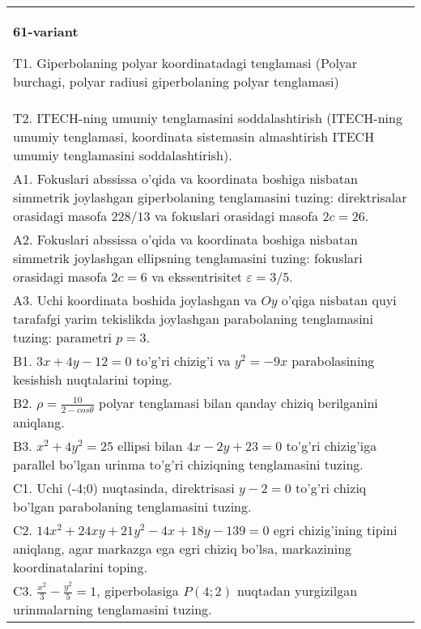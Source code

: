 \documentclass{article}
\begin{document}
\begin{tabular}{m{17cm}}
\textbf{61-variant}
\newline

T1. Giperbolaning polyar koordinatadagi tenglamasi (Polyar burchagi, polyar radiusi giperbolaning polyar tenglamasi)\\

T2. ITECH-ning umumiy tenglamasini soddalashtirish (ITECH-ning umumiy tenglamasi, koordinata sistemasin almashtirish ITECH umumiy tenglamasini soddalashtirish).\\

A1. Fokuslari abssissa o'qida va koordinata boshiga nisbatan simmetrik joylashgan giperbolaning tenglamasini tuzing: direktrisalar orasidagi masofa $228/13$ va fokuslari orasidagi masofa $2c=26$.\\

A2. Fokuslari abssissa o'qida va koordinata boshiga nisbatan simmetrik joylashgan ellipsning tenglamasini tuzing: fokuslari orasidagi masofa $2c=6$ va ekssentrisitet $\varepsilon=3/5$.\\

A3. Uchi koordinata boshida joylashgan va $Oy$ o'qiga nisbatan quyi tarafafgi yarim tekislikda joylashgan parabolaning tenglamasini tuzing: parametri $p=3$.\\

B1. $3x + 4y - 12 = 0$ to'g'ri chizig'i va $y^{2} = - 9x$ parabolasining kesishish nuqtalarini toping.\\

B2. $\rho = \frac{10}{2 - cos\theta}$ polyar tenglamasi bilan qanday chiziq berilganini aniqlang.  \\

B3. $x^{2} + 4y^{2} = 25$ ellipsi bilan $4x - 2y + 23 = 0$ to'g'ri chizig'iga parallel bo'lgan urinma to'g'ri chiziqning tenglamasini tuzing.  \\

C1. Uchi (-4;0) nuqtasinda, direktrisasi $y - 2 = 0$ to'g'ri chiziq bo'lgan parabolaning tenglamasini tuzing.\\

C2. $14x^{2} + 24xy + 21y^{2} - 4x + 18y - 139 = 0$ egri chizig'ining tipini aniqlang, agar markazga ega egri chiziq bo'lsa, markazining koordinatalarini toping.  \\

C3. $\frac{x^{2}}{3} - \frac{y^{2}}{5} = 1$, giperbolasiga $P(4;2)$ nuqtadan yurgizilgan urinmalarning tenglamasini tuzing.  \\

\end{tabular}
\vspace{1cm}
\end{document}
